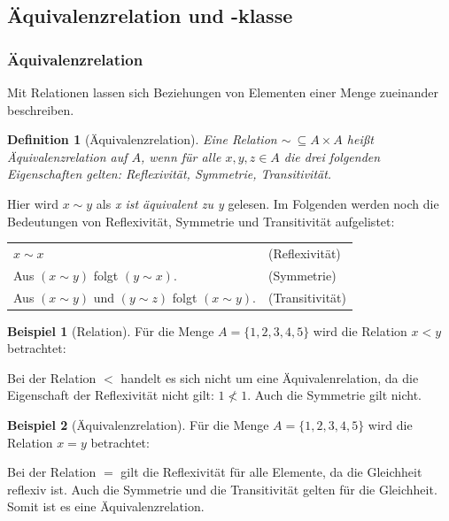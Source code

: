 \documentclass[12pt,a4paper, usenames, dvipsnames]{article}
\theoremstyle{mystyle}
\newtheorem{definition}{Definition}
\theoremstyle{definition}
\newtheorem{bsp}{Beispiel}[definition]
\begin{document}
\subsection{Äquivalenzrelation und -klasse}

 
\subsubsection*{Äquivalenzrelation}

 \label{Abschnitt_Äquivalenrelationen}

Mit Relationen lassen sich Beziehungen von Elementen einer Menge zueinander beschreiben.

\begin{definition}[Äquivalenzrelation]
Eine Relation $\sim \ \subseteq A \times A$ heißt Äquivalenzrelation auf $A$, wenn für alle $x, y, z \in A$ die drei folgenden Eigenschaften gelten: Reflexivität, Symmetrie, Transitivität.
\end{definition}


Hier wird $x \sim y$ als \textit{x ist äquivalent zu y} gelesen. Im Folgenden werden noch die Bedeutungen von Reflexivität, Symmetrie und Transitivität aufgelistet:

\begin{center}
\begin{tabular}{ll}
$x \sim x$ & (Reflexivität) \\
Aus $(x \sim y)$ folgt $(y \sim x)$. & (Symmetrie) \\
Aus $(x \sim y)$ und $(y \sim z)$ folgt $(x \sim y)$. & (Transitivität) \\
\end{tabular}
\end{center}


\begin{bsp}[Relation]


Für die Menge $A=\{ 1, 2, 3, 4, 5 \}$ wird die Relation $ x < y$ betrachtet:

Bei der Relation $< $ handelt es sich nicht um eine Äquivalenrelation, da die Eigenschaft der Reflexivität nicht gilt: $1 \nless 1$. Auch die Symmetrie gilt nicht.


\end{bsp}
\begin{bsp}[Äquivalenzrelation]
Für die Menge $A=\{ 1, 2, 3, 4, 5 \}$ wird die Relation $ x = y$ betrachtet:

Bei der Relation $=$ gilt die Reflexivität für alle Elemente, da die Gleichheit reflexiv ist. Auch die Symmetrie und die Transitivität gelten für die Gleichheit. Somit ist es eine Äquivalenzrelation. 


\end{bsp}
\end{document}
